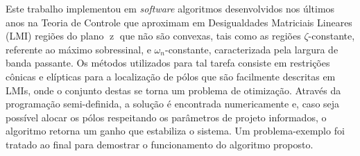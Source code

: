 \documentclass[
12pt,
openright,
twoside,
a4paper,
brazil
]{abntex2}
\DeclareMathOperator{\z}{\mathrm{z}}
\begin{document}
\pretextual
\imprimircapa
\imprimirfolhaderosto



\begin{resumo}
	Este trabalho implementou em \emph{software} algoritmos desenvolvidos nos últimos anos na Teoria de Controle que aproximam em Desigualdades Matriciais Lineares (LMI) regiões do plano $\z$ que não são convexas, tais como as regiões $\zeta$-constante, referente ao máximo sobressinal, e $\omega_n$-constante, caracterizada pela largura de banda passante. Os métodos utilizados para tal tarefa consiste em restrições cônicas e elípticas para a localização de pólos que são facilmente descritas em LMIs, onde o conjunto destas se torna um problema de otimização. Através da programação semi-definida, a solução é encontrada numericamente e, caso seja possível alocar os pólos respeitando os parâmetros de projeto informados, o algoritmo retorna um ganho que estabiliza o sistema. Um problema-exemplo foi tratado ao final para demostrar o funcionamento do algoritmo proposto. 
\end{resumo}

\tableofcontents
\textual





\postextual


\begin{anexosenv}
	
	
	
	
	
	
	
	
\end{anexosenv}
\end{document}
